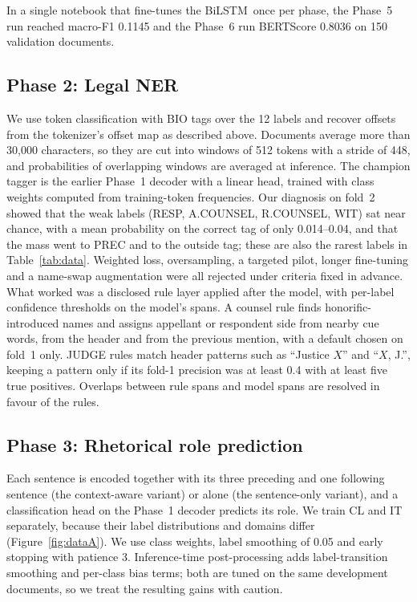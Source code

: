 \documentclass[10pt,a4paper]{article}
\newcommand{\bs}{BiLSTM}
\begin{document}
In a single notebook that fine-tunes the \bs\ once per phase, the Phase~5 run reached macro-F1 0.1145 and the Phase~6 run BERTScore 0.8036 on 150 validation documents.

\subsection{Phase 2: Legal NER}
We use token classification with BIO tags over the 12 labels and recover offsets from the tokenizer's offset map as described above. Documents average more than 30{,}000 characters, so they are cut into windows of 512 tokens with a stride of 448, and probabilities of overlapping windows are averaged at inference. The champion tagger is the earlier Phase~1 decoder with a linear head, trained with class weights computed from training-token frequencies. Our diagnosis on fold~2 showed that the weak labels (RESP, A.COUNSEL, R.COUNSEL, WIT) sat near chance, with a mean probability on the correct tag of only 0.014--0.04, and that the mass went to PREC and to the outside tag; these are also the rarest labels in Table~\ref{tab:data}. Weighted loss, oversampling, a targeted pilot, longer fine-tuning and a name-swap augmentation were all rejected under criteria fixed in advance. What worked was a disclosed rule layer applied after the model, with per-label confidence thresholds on the model's spans. A counsel rule finds honorific-introduced names and assigns appellant or respondent side from nearby cue words, from the header and from the previous mention, with a default chosen on fold~1 only. JUDGE rules match header patterns such as ``Justice $X$'' and ``$X$, J.'', keeping a pattern only if its fold-1 precision was at least 0.4 with at least five true positives. Overlaps between rule spans and model spans are resolved in favour of the rules.

\subsection{Phase 3: Rhetorical role prediction}
Each sentence is encoded together with its three preceding and one following sentence (the context-aware variant) or alone (the sentence-only variant), and a classification head on the Phase~1 decoder predicts its role. We train CL and IT separately, because their label distributions and domains differ (Figure~\ref{fig:dataA}). We use class weights, label smoothing of 0.05 and early stopping with patience 3. Inference-time post-processing adds label-transition smoothing and per-class bias terms; both are tuned on the same development documents, so we treat the resulting gains with caution.
\end{document}
